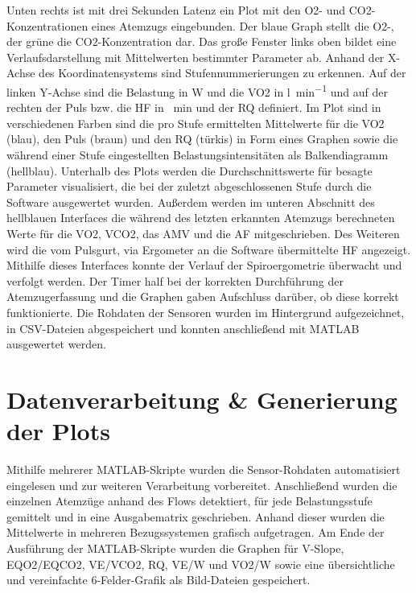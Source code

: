 Unten rechts ist mit drei Sekunden Latenz ein Plot mit den \acs{O2}- und \acs{CO2}-Konzentrationen eines Atemzugs eingebunden. Der blaue Graph stellt die \acs{O2}-, der grüne die \acs{CO2}-Konzentration dar. Das große Fenster links oben bildet eine Verlaufsdarstellung mit Mittelwerten bestimmter Parameter ab. Anhand der X-Achse des Koordinatensystems sind Stufennummerierungen zu erkennen. Auf der linken Y-Achse sind die Belastung in \si{\watt} und die \acs{VO2} in \si{\litre\per\minute} und auf der rechten der Puls bzw. die \acs{HF} in \si{\per\minute} und der \acs{RQ} definiert. Im Plot sind in verschiedenen Farben sind die pro Stufe ermittelten Mittelwerte für die \acs{VO2} (blau), den Puls (braun) und den \acs{RQ} (türkis) in Form eines Graphen sowie die während einer Stufe eingestellten Belastungsintensitäten als Balkendiagramm (hellblau). Unterhalb des Plots werden die Durchschnittswerte für besagte Parameter visualisiert, die bei der zuletzt abgeschlossenen Stufe durch die Software ausgewertet wurden. Außerdem werden im unteren Abschnitt des hellblauen Interfaces die während des letzten erkannten Atemzugs berechneten Werte für die \ac{VO2}, \ac{VCO2}, das \ac{AMV} und die \ac{AF} mitgeschrieben. Des Weiteren wird die vom Pulsgurt, via Ergometer an die Software übermittelte \ac{HF} angezeigt. Mithilfe dieses Interfaces konnte der Verlauf der Spiroergometrie überwacht und verfolgt werden. Der Timer half bei der korrekten Durchführung der Atemzugerfassung und die Graphen gaben Aufschluss darüber, ob diese korrekt funktionierte. Die Rohdaten der Sensoren wurden im Hintergrund aufgezeichnet, in \acs{CSV}-Dateien abgespeichert und konnten anschließend mit MATLAB ausgewertet werden.

\section{Datenverarbeitung \& Generierung der Plots}

Mithilfe mehrerer MATLAB-Skripte wurden die Sensor-Rohdaten automatisiert eingelesen und zur weiteren Verarbeitung vorbereitet. Anschließend wurden die einzelnen Atemzüge anhand des Flows detektiert, für jede Belastungsstufe gemittelt und in eine Ausgabematrix geschrieben. Anhand dieser wurden die Mittelwerte in mehreren Bezugssystemen grafisch aufgetragen. Am Ende der Ausführung der MATLAB-Skripte wurden die Graphen für V-Slope, \acs{EQO2}/\acs{EQCO2}, \acs{VE}/\acs{VCO2}, \acs{RQ}, \acs{VE}/\acs{W} und \acs{VO2}/\acs{W} sowie eine übersichtliche und vereinfachte 6-Felder-Grafik als Bild-Dateien gespeichert. 

